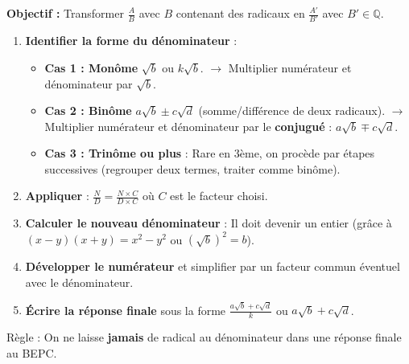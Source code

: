 \documentclass[11pt]{article}
\newcommand{\cle}[1]{{\popxbold\color{popdark}#1}}
\begin{document}
\begin{methode}
\textbf{Objectif :} Transformer $\frac{A}{B}$ avec $B$ contenant des radicaux en $\frac{A'}{B'}$ avec $B' \in \mathbb{Q}$.
\begin{enumerate}
    \item \textbf{Identifier la forme du dénominateur} :
    \begin{itemize}
        \item \textbf{Cas 1 : Monôme} $\sqrt{b}$ ou $k\sqrt{b}$. $\to$ Multiplier numérateur et dénominateur par $\sqrt{b}$.
        \item \textbf{Cas 2 : Binôme} $a\sqrt{b} \pm c\sqrt{d}$ (somme/différence de deux radicaux). $\to$ Multiplier numérateur et dénominateur par le \textbf{conjugué} : $a\sqrt{b} \mp c\sqrt{d}$.
        \item \textbf{Cas 3 : Trinôme ou plus} : Rare en 3ème, on procède par étapes successives (regrouper deux termes, traiter comme binôme).
    \end{itemize}
    \item \textbf{Appliquer} : $\frac{N}{D} = \frac{N \times C}{D \times C}$ où $C$ est le facteur choisi.
    \item \textbf{Calculer le nouveau dénominateur} : Il doit devenir un entier (grâce à $(x-y)(x+y)=x^2-y^2$ ou $(\sqrt{b})^2=b$).
    \item \textbf{Développer le numérateur} et simplifier par un facteur commun éventuel avec le dénominateur.
    \item \textbf{Écrire la réponse finale} sous la forme $\frac{a\sqrt{b} + c\sqrt{d}}{k}$ ou $a\sqrt{b} + c\sqrt{d}$.
\end{enumerate}
\cle{Règle} : On ne laisse \textbf{jamais} de radical au dénominateur dans une réponse finale au BEPC.
\end{methode}
\end{document}
